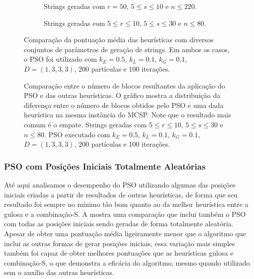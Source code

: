     \begin{figure}[hp]
        \centering
        \begin{subfigure}[b]{\textwidth}
            \centering
            \caption{Strings geradas com $r = 50$, $5 \leq s \leq 10$ e $n \leq 220$.}
            \vspace{12pt}
        \end{subfigure}

        \begin{subfigure}[b]{\textwidth}
            \centering

            \caption{Strings geradas com $5 \leq r \leq 10$, $5 \leq s \leq 30$ e $n \leq 80$.}
            \vspace{12pt}
        \end{subfigure}

        \caption{Comparação da pontuação média das heurísticas com diversos conjuntos de parâmetros de geração de strings. Em ambos os casos, o PSO foi utilizado com $k_E = 0.5$, $k_L = 0.1$, $k_G = 0.1$, $D = (1, 3, 3, 3)$, 200 partículas e 100 iterações.}
        \label{fig:comparacao-pontuacao}
    \end{figure}

    \begin{figure}[hbt]
        \centering

        \caption{Comparação entre o número de blocos resultantes da aplicação do PSO e das outras heurísticas. O gráfico mostra a distribuição da diferença entre o número de blocos obtidos pelo PSO e uma dada heurística na mesma instância do MCSP. Note que o resultado mais comum é o empate. Strings geradas com $5 \leq r \leq 10$, $5 \leq s \leq 30$ e $n \leq 80$. PSO executado com $k_E = 0.5$, $k_L = 0.1$, $k_G = 0.1$, $D = (1, 3, 3, 3)$, 200 partículas e 100 iterações.}
        \label{fig:pso-diff}
    \end{figure}

    \subsubsection{PSO com Posições Iniciais Totalmente Aleatórias}

        Até aqui analisamos o desempenho do PSO utilizando algumas das posições iniciais criadas a partir de resultados de outras heurísticas, de forma que seu resultado foi sempre no mínimo tão bom quanto ao da melhor heurística entre a gulosa e a combinação-S. A  mostra uma comparação que inclui também o PSO com todas as posições iniciais sendo geradas de forma totalmente aleatória. Apesar de obter uma pontuação média ligeiramente menor que o algoritmo que inclui as outras formas de gerar posições iniciais, essa variação mais simples também foi capaz de obter melhores pontuações que as heurísticas gulosa e combinação-S, o que demonstra a eficácia do algoritmo, mesmo quando utilizado sem o auxílio das outras heurísticas.

